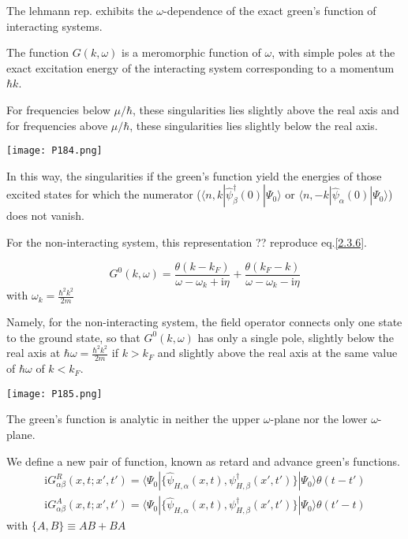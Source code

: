 The lehmann rep. exhibits the $\omega$-dependence of the exact green's function of interacting systems.

The function $G(k,\omega)$ is a meromorphic function of $\omega$, with simple poles at the exact excitation energy of the interacting system corresponding to a momentum $\hbar k$.

For frequencies below $\mu/\hbar$, these singularities lies slightly above the real axis and for frequencies above $\mu/\hbar$, these singularities  lies slightly below the real axis.

\begin{center}
\texttt{[image: P184.png]}
\end{center}
In this way, the singularities if the green's function yield the energies of those excited states for which the numerator ($\langle n,k|\hat \psi^{
\dagger}_{\beta} (0)|\Psi_0\rangle$ or $\langle n,-k|\hat \psi_{\alpha}(0)|\Psi_0\rangle$) does not vanish. 

For the non-interacting system, this representation ?? reproduce eq.\ref{2.3.6}.

\begin{equation}
G^0(k,\omega)=\frac{\theta(k-k_F)}{\omega-\omega_k+\mathrm{i}\eta}+\frac{\theta(k_F-k)}{\omega-\omega_k-\mathrm{i}\eta} \nonumber
\end{equation} 
with $\omega_k=\frac{\hbar^2k^2}{2m}$

Namely, for the non-interacting system, the field operator connects only one state to the ground state, so that $G^0(k,\omega)$ has only a single pole, slightly below the real axis at $\hbar \omega=\frac{\hbar^2k^2}{2m}$ if $k>k_F$ and slightly above the real axis at the same value of $\hbar \omega$ of $k<k_F$.


\begin{center}
\texttt{[image: P185.png]}
\end{center}

The green's function is analytic in neither the upper $\omega$-plane nor the lower $\omega$-plane.

We define a new pair of function, known as retard and advance green's functions.
\begin{align}\label{2.3.13}
\mathrm{i}G^R_{\alpha\beta}(x,t;x',t')=\langle \Psi_0|\{\hat \psi_{H,\alpha}(x,t),\psi^{\dagger}_{H,\beta}(x',t')\}|\Psi_0\rangle\theta(t-t')
\end{align}
\begin{align}\label{2.3.14}
\mathrm{i}G^A_{\alpha\beta}(x,t;x',t')=\langle \Psi_0|\{\hat \psi_{H,\alpha}(x,t),\psi^{\dagger}_{H,\beta}(x',t')\}|\Psi_0\rangle\theta(t'-t)
\end{align}
with $\{A,B\}\equiv AB+BA$

